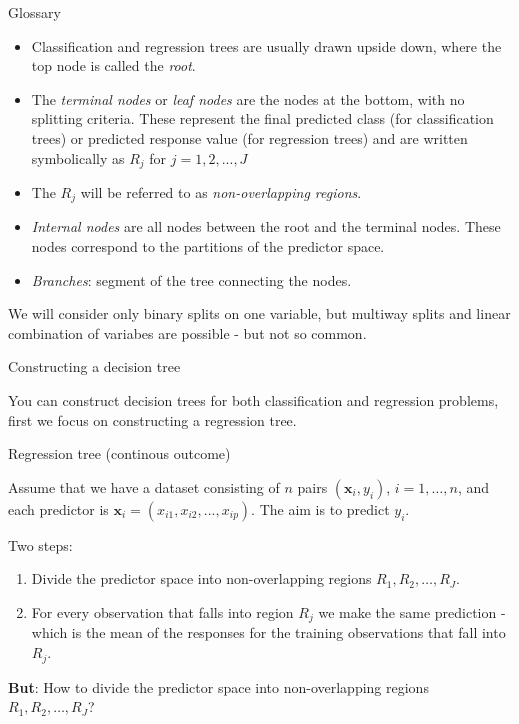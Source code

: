 \documentclass[10pt,ignorenonframetext,]{beamer}
\begin{document}
\begin{frame}

\begin{block}{Glossary}

\begin{itemize}
\item
  Classification and regression trees are usually drawn upside down,
  where the top node is called the \emph{root}.
\item
  The \emph{terminal nodes} or \emph{leaf nodes} are the nodes at the
  bottom, with no splitting criteria. These represent the final
  predicted class (for classification trees) or predicted response value
  (for regression trees) and are written symbolically as \(R_j\) for
  \(j = 1, 2, ..., J\)
\item
  The \(R_j\) will be referred to as \emph{non-overlapping regions}.
\item
  \emph{Internal nodes} are all nodes between the root and the terminal
  nodes. These nodes correspond to the partitions of the predictor
  space.
\item
  \emph{Branches}: segment of the tree connecting the nodes.
\end{itemize}

We will consider only binary splits on one variable, but multiway splits
and linear combination of variabes are possible - but not so common.

\end{block}

\end{frame}

\begin{frame}{Constructing a decision tree}

You can construct decision trees for both classification and regression
problems, first we focus on constructing a regression tree.

\begin{block}{Regression tree (continous outcome)}

Assume that we have a dataset consisting of \(n\) pairs
\((\boldsymbol{x}_i,y_i)\), \(i=1,\ldots,n\), and each predictor is
\({\boldsymbol{x}}_i=(x_{i1},x_{i2},...,x_{ip})\). The aim is to predict
\(y_i\).

\vspace{2mm} Two steps:

\begin{enumerate}
\def\labelenumi{\arabic{enumi}.}
\item
  Divide the predictor space into non-overlapping regions
  \(R_1,R_2,\ldots,R_J\).
\item
  For every observation that falls into region \(R_j\) we make the same
  prediction - which is the mean of the responses for the training
  observations that fall into \(R_j\).
\end{enumerate}

\vspace{2mm}

\textbf{But}: How to divide the predictor space into non-overlapping
regions \(R_1,R_2,\ldots,R_J\)?

\end{block}

\end{frame}
\end{document}
